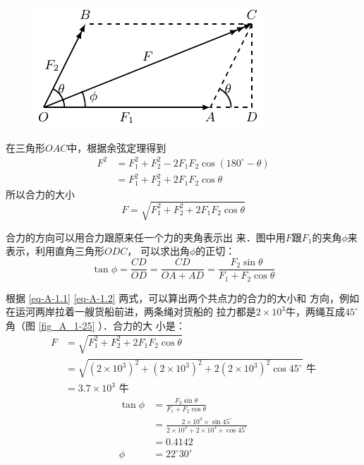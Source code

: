 \begin{figure} [htp]
\centering
\includegraphics{fig/A/1-24.pdf} 
\caption{} \label{fig_A_1-24} 
\end{figure} 


    在三角形$OAC$中，根据余弦定理得到
\[\begin{split} 
F^2 & = F_1^2+F_2^2-2F_1F_2\cos(180^\circ -\theta)  \\
&= F_1^2+F_2^2+2F_1F_2\cos\theta
\end{split}  \]
所以合力的大小
\begin{equation}\label{eq-A-1.1}
F=\sqrt{F_1^2+F_2^2+2F_1F_2\cos\theta} 
\end{equation} 

    合力的方向可以用合力跟原来任一个力的夹角表示出
来．图中用$F$跟$F_1$的夹角$\phi$来表示，利用直角三角形$ODC$，
可以求出角$\phi$的正切：
\begin{equation}\label{eq-A-1.2}
\tan\phi =\frac{CD} {OD} =\frac{CD} {OA+AD} =\frac{F_2\sin\theta } {F_1+F_2\cos\theta} 
\end{equation} 




    根据 \eqref{eq-A-1.1} \eqref{eq-A-1.2} 两式，可以算出两个共点力的合力的大小和
方向，例如在运河两岸拉着一艘货船前进，两条绳对货船的
拉力都是$2\times 10^3$牛，两绳互成$45^\circ$角（图 \ref{fig_A_1-25} ）．合力的大
小是：
\[\begin{split} 
F&= \sqrt{F_1^2+F_2^2+2F_1F_2\cos\theta} \\
&=\sqrt{(2\times 10^3)^2+(2\times 10^3)^2+2(2\times 10^3)^2\cos 45^{\circ} } \text{ 牛} \\
&=3.7\times 10^3\text{ 牛} 
\end{split}  \]
\[\begin{split} 
\tan\phi&= \frac{F_2\sin\theta } {F_1+F_2\cos\theta} \\
&= \frac{2\times 10^3\times \sin 45^{\circ} } {2\times 10^3+2\times 10^3\times \cos 45^{\circ} }   \\
&=0.4142\\
\phi &= 22^{\circ}  30'
\end{split}  \]

